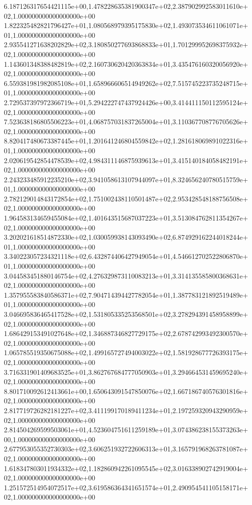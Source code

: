 6.187126317654421115e+00,1.478228635381900347e+02,2.387902992583011610e+02,1.000000000000000000e+00
1.822325482821796427e+01,1.080568979395175830e+02,1.493073534611061071e+01,1.000000000000000000e+00
2.935541271638202829e+02,3.180850277693868833e+01,1.701299952698375932e+02,1.000000000000000000e+00
1.143601348388482819e+02,2.160730620420363834e+01,3.435476160320056920e+02,1.000000000000000000e+00
6.559381981982085108e+01,1.658966606514949262e+02,7.515745223735248715e+01,1.000000000000000000e+00
2.729537397972366719e+01,5.294222747437924426e+00,3.414411150112595124e+02,1.000000000000000000e+00
7.523638186805506223e+01,4.068757031837265004e+01,3.110367708776705626e+02,1.000000000000000000e+00
8.820417480673387445e+01,1.201641246804559842e+02,1.281618069891022316e+01,1.000000000000000000e+00
2.020619542854478539e+02,4.984311146875939613e+01,3.415140184058482191e+02,1.000000000000000000e+00
2.243233485912235210e+02,3.941058613107944097e+01,8.324656240780515759e+01,1.000000000000000000e+00
2.782129014843172854e+02,1.751002438110501487e+02,2.953428548188756508e+02,1.000000000000000000e+00
1.964583134659455084e+02,1.401643515687037223e+01,3.513084762811354267e+02,1.000000000000000000e+00
3.202021618514872330e+02,1.030059938143093490e+02,6.874929162244018244e+01,1.000000000000000000e+00
3.340223057234321118e+02,6.432874406427949054e+01,4.546612702522806870e+01,1.000000000000000000e+00
3.044583451880146754e+02,4.276329873110083213e+01,3.314135585800368631e+02,1.000000000000000000e+00
1.357955583840586371e+02,7.904714394427782054e+01,1.387783121892519489e+01,1.000000000000000000e+00
3.046695836465417528e+02,1.531805335253568501e+02,3.278294391458958899e+02,1.000000000000000000e+00
1.686429153491027648e+02,1.346887346827729175e+02,2.678742993492300570e+02,1.000000000000000000e+00
1.065785519350675088e+02,1.499165727494003022e+02,1.581928677726393175e+02,1.000000000000000000e+00
3.716331901409683525e+01,3.862767684777050903e+01,3.294664531459695240e+02,1.000000000000000000e+00
8.801710092612413661e+00,1.650643091547850076e+02,1.667186740576301816e+02,1.000000000000000000e+00
2.817719726282181227e+02,3.411199170189411234e+01,2.197259320943290959e+02,1.000000000000000000e+00
2.814504269599503061e+01,4.523604751611259189e+01,3.074386238155373263e+00,1.000000000000000000e+00
2.677953055352730303e+02,3.606251932722606313e+01,3.165791968263781087e+02,1.000000000000000000e+00
1.618347803011934332e+02,1.182860942261095545e+02,3.016338902742919004e+02,1.000000000000000000e+00
1.251572514954072517e+02,3.619586364341651574e+01,2.490954541105158171e+02,1.000000000000000000e+00
